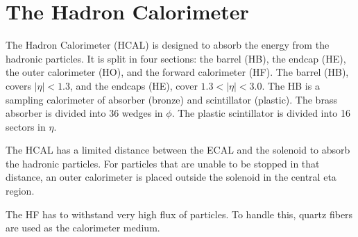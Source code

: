\vspace{-3pt}
\section{The Hadron Calorimeter}\label{sec:ch3:hcal}


The Hadron Calorimeter (HCAL) is designed to absorb the energy from the hadronic particles. It is split in four sections: the barrel (HB), the endcap (HE), the outer calorimeter (HO), and the forward calorimeter (HF). The barrel (HB), covers $|\eta| < 1.3$, and the endcaps (HE), cover $1.3 < |\eta| < 3.0$. The HB is a sampling calorimeter of absorber (bronze) and scintillator (plastic). The brass absorber is divided into 36 wedges in $\phi$. The plastic scintillator is divided into 16 sectors in $\eta$. 

The HCAL has a limited distance between the ECAL and the solenoid to absorb the hadronic particles. For particles that are unable to be stopped in that distance, an outer calorimeter is placed outside the solenoid in the central eta region.

The HF has to withstand very high flux of particles. To handle this, quartz fibers are used as the calorimeter medium. 
